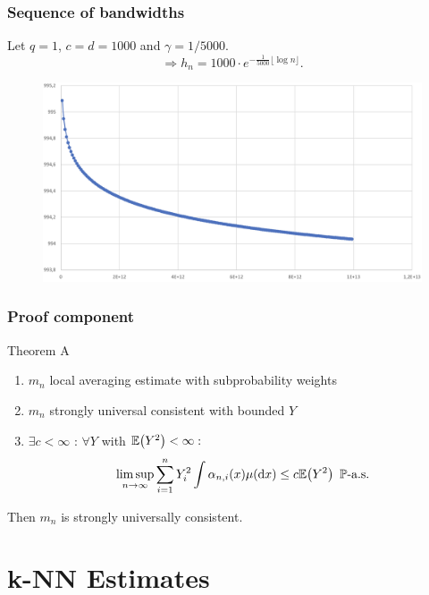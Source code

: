 \begin{frame}
\frametitle{Sequence of bandwidths}
Let $q=1$, $c=d=1000$ and $\gamma =1/5000$.
\[
    \Rightarrow h_n = 1000 \cdot e^{-\frac{1}{5000}\lfloor \log n \rfloor}.
\]
\begin{figure}
    \includegraphics[scale=0.12]{bandwidth_seq.jpeg}
    \centering
\end{figure}

\end{frame}

\begin{frame}
\frametitle{Proof component}
\begin{block} {Theorem A}
\begin{enumerate} [label=(\roman*)]
    \item $m_n$ local averaging estimate with subprobability weights
    \item $m_n$ strongly universal consistent with bounded $Y$
    \item $\exists c < \infty $ : $\forall Y$ with $\mathbb{E}\!\left(Y^2\right)<\infty : $
\[\limsup_{n \to \infty} \sum_{i=1}^{n}Y_i^2 \int \alpha_{n,i}(x) \mu(\diff{x}) \leq c\ev{Y^2} \ \text{\(\mathbb{P}\)-a.s.}\]
\end{enumerate}
Then $m_n$ is strongly universally consistent.
\end{block}
    
\end{frame}


\section{k-NN Estimates}

